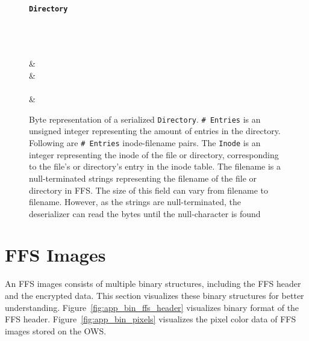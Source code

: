 \begin{figure}[!htb]
	\label{fig:app_bin_dir}
	\centering
    \textbf{\texttt{Directory}}\par\medskip

	\begin{bytefield}[bitwidth=0.0625\textwidth]{16}
		 \\
		 \\
		 \\
		 & \\
		 & \\
		 \\[1ex]
		 & \\
	\end{bytefield}
	\caption[Byte representation of the serialization of an \texttt{Directory} object]{Byte representation of a serialized \texttt{Directory}. \texttt{\#~Entries} is an unsigned integer representing the amount of entries in the directory. Following are \texttt{\#~Entries} inode-filename pairs. The \texttt{Inode} is an integer representing the inode of the file or directory, corresponding to the file's or directory's entry in the inode table. The filename is a null-terminated strings representing the filename of the file or directory in FFS. The size of this field can vary from filename to filename. However, as the strings are null-terminated, the deserializer can read the bytes until the null-character is found}
\end{figure}

\section{FFS Images}
An FFS images consists of multiple binary structures, including the FFS header and the encrypted data. This section visualizes these binary structures for better understanding. Figure~\ref{fig:app_bin_ffs_header} visualizes binary format of the FFS header. Figure~\ref{fig:app_bin_pixels} visualizes the pixel color data of FFS images stored on the OWS.

